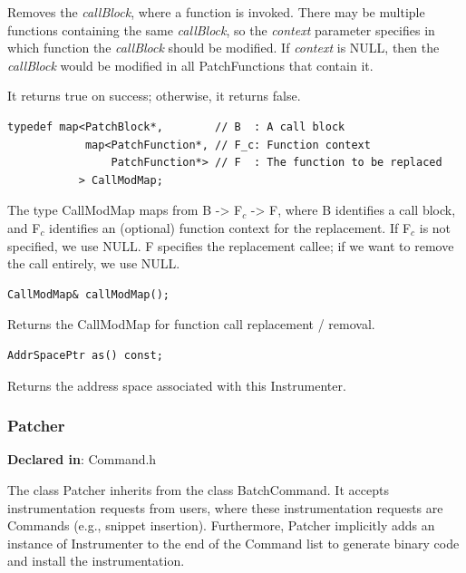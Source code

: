 \documentclass[11pt]{article}
\begin{document}
Removes the \emph{callBlock}, where a function is invoked. There may be multiple
functions containing the same \emph{callBlock}, so the \emph{context} parameter specifies
in which function the \emph{callBlock} should be modified. If \emph{context} is NULL, then
the \emph{callBlock} would be modified in all PatchFunctions that contain it.

It returns true on success; otherwise, it returns false.


\begin{verbatim}
typedef map<PatchBlock*,        // B  : A call block
            map<PatchFunction*, // F_c: Function context
                PatchFunction*> // F  : The function to be replaced
           > CallModMap;

\end{verbatim}



The type CallModMap maps from B -> F$_c$ -> F, where B identifies a call block,
and F$_c$ identifies an (optional) function context for the replacement. If F$_c$ is
not specified, we use NULL. F specifies the replacement callee; if we want to
remove the call entirely, we use NULL.


\begin{verbatim}
CallModMap& callModMap();

\end{verbatim}



Returns the CallModMap for function call replacement / removal.


\begin{verbatim}
AddrSpacePtr as() const;

\end{verbatim}



Returns the address space associated with this Instrumenter.

\subsubsection{Patcher}
\label{sec-3.2.6}

\textbf{Declared in}: Command.h

The class Patcher inherits from the class BatchCommand. It accepts
instrumentation requests from users, where these instrumentation requests are
Commands (e.g., snippet insertion). Furthermore, Patcher implicitly adds an
instance of Instrumenter to the end of the Command list to generate binary code
and install the instrumentation.
\end{document}
